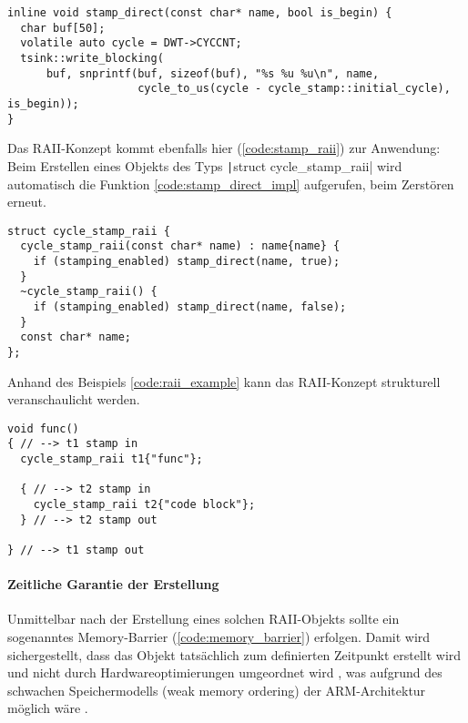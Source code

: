 \begin{code}
\begin{verbatim}
inline void stamp_direct(const char* name, bool is_begin) {
  char buf[50];
  volatile auto cycle = DWT->CYCCNT;
  tsink::write_blocking(
      buf, snprintf(buf, sizeof(buf), "%s %u %u\n", name,
                    cycle_to_us(cycle - cycle_stamp::initial_cycle), is_begin));
}
\end{verbatim}
    \label{code:stamp_direct_impl}
\end{code}

Das RAII-Konzept kommt ebenfalls hier (\ref{code:stamp_raii}) zur Anwendung:
Beim Erstellen eines Objekts des Typs \texttt|struct cycle_stamp_raii|
wird automatisch die Funktion \ref{code:stamp_direct_impl} aufgerufen, beim
Zerstören erneut.

\begin{code}
\begin{verbatim}
struct cycle_stamp_raii {
  cycle_stamp_raii(const char* name) : name{name} {
    if (stamping_enabled) stamp_direct(name, true);
  }
  ~cycle_stamp_raii() {
    if (stamping_enabled) stamp_direct(name, false);
  }
  const char* name;
};

\end{verbatim}
    \label{code:stamp_raii}
\end{code}

Anhand des Beispiels \ref{code:raii_example} kann das RAII-Konzept strukturell
veranschaulicht werden.

\begin{code}
\begin{verbatim}
void func()
{ // --> t1 stamp in
  cycle_stamp_raii t1{"func"};

  { // --> t2 stamp in
    cycle_stamp_raii t2{"code block"};
  } // --> t2 stamp out

} // --> t1 stamp out
\end{verbatim}
    \label{code:raii_example}
\end{code}

\paragraph{Zeitliche Garantie der Erstellung}

Unmittelbar nach der Erstellung eines solchen RAII-Objekts sollte ein
sogenanntes Memory-Barrier (\ref{code:memory_barrier}) erfolgen. Damit wird
sichergestellt, dass das Objekt tatsächlich zum definierten Zeitpunkt erstellt
wird und nicht durch Hardwareoptimierungen umgeordnet wird
\cite{arm_mem_barrier}, was aufgrund des schwachen Speichermodells (weak memory
ordering) der ARM-Architektur möglich wäre \cite[S. 5]{arm_sync_overview}.


